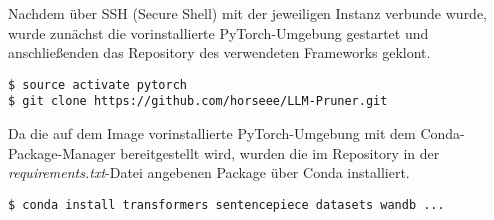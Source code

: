\begin{table}[ht!]
	\centering

	\caption{Attribute der verwendeten Hardware}
\end{table}

Nachdem über SSH (Secure Shell) mit der jeweiligen Instanz verbunde wurde,
wurde zunächst die vorinstallierte PyTorch-Umgebung gestartet und
anschließenden das Repository des verwendeten Frameworks geklont.

\vspace{1em}
\begin{lstlisting}
$ source activate pytorch
$ git clone https://github.com/horseee/LLM-Pruner.git
\end{lstlisting}

Da die auf dem Image vorinstallierte PyTorch-Umgebung mit dem
Conda-Package-Manager bereitgestellt wird, wurden die im Repository in der
\emph{requirements.txt}-Datei angebenen Package über Conda installiert.

\vspace{1em}
\begin{lstlisting}
$ conda install transformers sentencepiece datasets wandb ...
\end{lstlisting}

